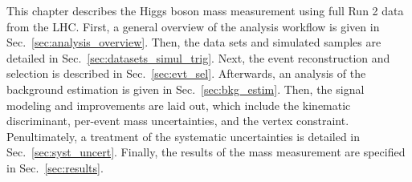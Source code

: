 This chapter describes the Higgs boson mass measurement using full Run 2 data from the LHC.
First, a general overview of the analysis workflow is given in Sec.~\ref{sec:analysis_overview}.
Then, the data sets and simulated samples are detailed in Sec.~\ref{sec:datasets_simul_trig}.
Next, the event reconstruction and selection is described in Sec.~\ref{sec:evt_sel}.
Afterwards, an analysis of the background estimation is given in Sec.~\ref{sec:bkg_estim}.
Then, the signal modeling and improvements are laid out, which include the kinematic discriminant, per-event mass uncertainties, and the vertex constraint.
Penultimately, a treatment of the systematic uncertainties is detailed in Sec.~\ref{sec:syst_uncert}.
Finally, the results of the mass measurement are specified in Sec.~\ref{sec:results}.

